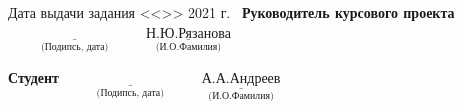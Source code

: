 \documentclass[a4paper, 10pt]{article}
\begin{document}
\begin{titlepage}
\begin{flushleft}
\small Дата выдачи задания <<\underline{\hspace{1cm}}>> \underline{\hspace{3cm}} 2021 г.
\newline
\ \small \textbf{Руководитель курсового проекта}
\small \hspace{3cm}$\underset{\text{(Подипсь, дата)}}{\underline{\hspace{4cm}}}$ 
\small \hspace{4mm}$\underset{\text{(И.О.Фамилия)}}{\underline{\text{Н.Ю.Рязанова}}}$ 
\end{flushleft}
\begin{flushleft}
\small \textbf{Студент}
\small \hspace{7.2cm}$\underset{\text{(Подипсь, дата)}}{\underline{\hspace{4cm}}}$ 
\small \hspace{5mm}$\underset{\text{(И.О.Фамилия)}}{\underline{\text{А.А.Андреев}}}$ 
\end{flushleft}

\end{titlepage}
\end{document}
